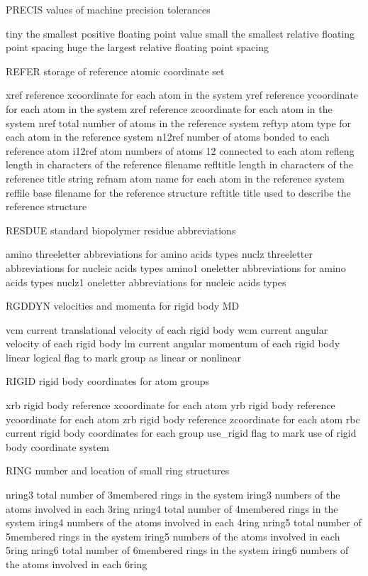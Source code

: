 \documentclass[letterpaper,11pt,english]{sphinxmanual}
\begin{document}
PRECIS  values of machine precision tolerances

tiny    the smallest positive floating point value
small   the smallest relative floating point spacing
huge    the largest relative floating point spacing

REFER   storage of reference atomic coordinate set

xref    reference x\sphinxhyphen{}coordinate for each atom in the system
yref    reference y\sphinxhyphen{}coordinate for each atom in the system
zref    reference z\sphinxhyphen{}coordinate for each atom in the system
nref    total number of atoms in the reference system
reftyp  atom type for each atom in the reference system
n12ref  number of atoms bonded to each reference atom
i12ref  atom numbers of atoms 1\sphinxhyphen{}2 connected to each atom
refleng length in characters of the reference filename
refltitle       length in characters of the reference title string
refnam  atom name for each atom in the reference system
reffile base filename for the reference structure
reftitle        title used to describe the reference structure

RESDUE  standard biopolymer residue abbreviations

amino   three\sphinxhyphen{}letter abbreviations for amino acids types
nuclz   three\sphinxhyphen{}letter abbreviations for nucleic acids types
amino1  one\sphinxhyphen{}letter abbreviations for amino acids types
nuclz1  one\sphinxhyphen{}letter abbreviations for nucleic acids types

RGDDYN  velocities and momenta for rigid body MD

vcm     current translational velocity of each rigid body
wcm     current angular velocity of each rigid body
lm      current angular momentum of each rigid body
linear  logical flag to mark group as linear or nonlinear

RIGID   rigid body coordinates for atom groups

xrb     rigid body reference x\sphinxhyphen{}coordinate for each atom
yrb     rigid body reference y\sphinxhyphen{}coordinate for each atom
zrb     rigid body reference z\sphinxhyphen{}coordinate for each atom
rbc     current rigid body coordinates for each group
use\_rigid       flag to mark use of rigid body coordinate system

RING    number and location of small ring structures

nring3  total number of 3\sphinxhyphen{}membered rings in the system
iring3  numbers of the atoms involved in each 3\sphinxhyphen{}ring
nring4  total number of 4\sphinxhyphen{}membered rings in the system
iring4  numbers of the atoms involved in each 4\sphinxhyphen{}ring
nring5  total number of 5\sphinxhyphen{}membered rings in the system
iring5  numbers of the atoms involved in each 5\sphinxhyphen{}ring
nring6  total number of 6\sphinxhyphen{}membered rings in the system
iring6  numbers of the atoms involved in each 6\sphinxhyphen{}ring
\end{document}
